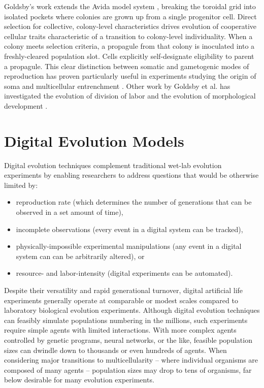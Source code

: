 Goldsby’s work extends the Avida model system \citep{ofria2009artificial}, breaking the toroidal grid into isolated pockets where colonies are grown up from a single progenitor cell.
Direct selection for collective, colony-level characteristics drives evolution of cooperative cellular traits characteristic of a transition to colony-level individuality.
When a colony meets selection criteria, a propagule from that colony is inoculated into a freshly-cleared population slot.
Cells explicitly self-designate eligibility to parent a propagule.
This clear distinction between somatic and gametogenic modes of reproduction has proven particularly useful in experiments studying the origin of soma \citep{goldsby2014evolutionary} and multicellular entrenchment \citep{goldsby2020major}.
Other work by Goldsby et al. has investigated the evolution of division of labor \citep{goldsby2010evolution, goldsby2012task} and the evolution of morphological development \citep{goldsby2017increasing}.

\section{Digital Evolution Models}

Digital evolution techniques complement traditional wet-lab evolution experiments by enabling researchers to address questions that would be otherwise limited by:
\begin{itemize}
\item reproduction rate (which determines the number of generations that can be observed in a set amount of time),
\item incomplete observations (every event in a digital system can be tracked),
\item physically-impossible experimental manipulations (any event in a digital system can can be arbitrarily altered), or
\item resource- and labor-intensity (digital experiments can be automated).
\end{itemize}

Despite their versatility and rapid generational turnover, digital artificial life experiments generally operate at comparable or modest scales compared to laboratory biological evolution experiments.
Although digital evolution techniques can feasibly simulate populations numbering in the millions, such experiments require simple agents with limited interactions.
With more complex agents controlled by genetic programs, neural networks, or the like, feasible population sizes can dwindle down to thousands or even hundreds of agents.
When considering major transitions to multicellularity -- where individual organisms are composed of many agents -- population sizes may drop to tens of organisms, far below desirable for many evolution experiments.

